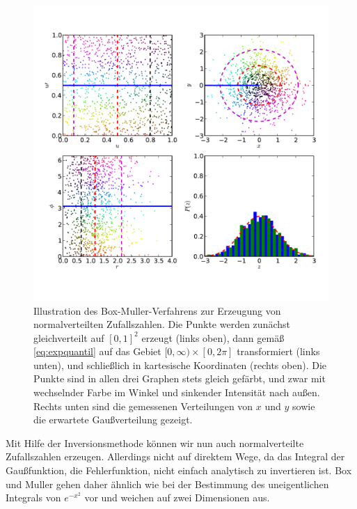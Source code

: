 \subsubsection{}

\begin{figure}
  \centering
  \includegraphics[width=\textwidth]{plots/inversion}
  \caption{Illustration des Box-Muller-Verfahrens zur Erzeugung von
    normalverteilten Zufallszahlen. Die Punkte werden zunächst
    gleichverteilt auf $[0,1]^2$ erzeugt (links oben), dann
    gemäß \eqref{eq:expquantil} auf das Gebiet
    $[0,\infty)\times[0,2\pi]$ transformiert (links unten), und
    schließlich in kartesische Koordinaten (rechts oben). Die Punkte
    sind in allen drei Graphen stets gleich gefärbt, und zwar mit
    wechselnder Farbe im Winkel und sinkender Intensität nach
    außen. Rechts unten sind die gemessenen Verteilungen von $x$ und
    $y$ sowie die erwartete Gaußverteilung gezeigt.}
  \label{fig:boxmuller}
\end{figure}

Mit Hilfe der Inversionsmethode können wir nun auch normalverteilte
Zufallszahlen erzeugen. Allerdings nicht auf direktem Wege, da das
Integral der Gaußfunktion, die Fehlerfunktion, nicht einfach
analytisch zu invertieren ist. Box und Muller gehen daher ähnlich wie
bei der Bestimmung des uneigentlichen Integrals von $e^{-x^2}$ vor
und weichen auf zwei Dimensionen aus.

